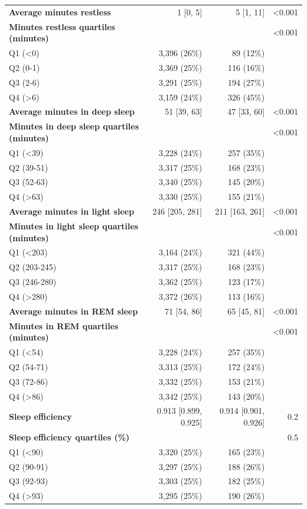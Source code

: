 \documentclass[11pt]{article}
\begin{document}
\begin{longtable}{@{}p{6.4cm}rrr@{}}
\textbf{Average minutes restless} & 1 [0, 5] & 5 [1, 11] & <0.001 \\
\textbf{Minutes restless quartiles (minutes)} &  &  & <0.001 \\
\quad Q1 (<0) & 3,396 (26\%) & 89 (12\%) &  \\
\quad Q2 (0-1) & 3,369 (25\%) & 116 (16\%) &  \\
\quad Q3 (2-6) & 3,291 (25\%) & 194 (27\%) &  \\
\quad Q4 (>6) & 3,159 (24\%) & 326 (45\%) &  \\
\textbf{Average minutes in deep sleep} & 51 [39, 63] & 47 [33, 60] & <0.001 \\
\textbf{Minutes in deep sleep quartiles (minutes)} &  &  & <0.001 \\
\quad Q1 (<39) & 3,228 (24\%) & 257 (35\%) &  \\
\quad Q2 (39-51) & 3,317 (25\%) & 168 (23\%) &  \\
\quad Q3 (52-63) & 3,340 (25\%) & 145 (20\%) &  \\
\quad Q4 (>63) & 3,330 (25\%) & 155 (21\%) &  \\
\textbf{Average minutes in light sleep} & 246 [205, 281] & 211 [163, 261] & <0.001 \\
\textbf{Minutes in light sleep quartiles (minutes)} &  &  & <0.001 \\
\quad Q1 (<203) & 3,164 (24\%) & 321 (44\%) &  \\
\quad Q2 (203-245) & 3,317 (25\%) & 168 (23\%) &  \\
\quad Q3 (246-280) & 3,362 (25\%) & 123 (17\%) &  \\
\quad Q4 (>280) & 3,372 (26\%) & 113 (16\%) &  \\
\textbf{Average minutes in REM sleep} & 71 [54, 86] & 65 [45, 81] & <0.001 \\
\textbf{Minutes in REM quartiles (minutes)} &  &  & <0.001 \\
\quad Q1 (<54) & 3,228 (24\%) & 257 (35\%) &  \\
\quad Q2 (54-71) & 3,313 (25\%) & 172 (24\%) &  \\
\quad Q3 (72-86) & 3,332 (25\%) & 153 (21\%) &  \\
\quad Q4 (>86) & 3,342 (25\%) & 143 (20\%) &  \\
\textbf{Sleep efficiency} & 0.913 [0.899, 0.925] & 0.914 [0.901, 0.926] & 0.2 \\
\textbf{Sleep efficiency quartiles (\%)} &  &  & 0.5 \\
\quad Q1 (<90) & 3,320 (25\%) & 165 (23\%) &  \\
\quad Q2 (90-91) & 3,297 (25\%) & 188 (26\%) &  \\
\quad Q3 (92-93) & 3,303 (25\%) & 182 (25\%) &  \\
\quad Q4 (>93) & 3,295 (25\%) & 190 (26\%) &  \\
\bottomrule \end{longtable}\normalsize
\end{document}
